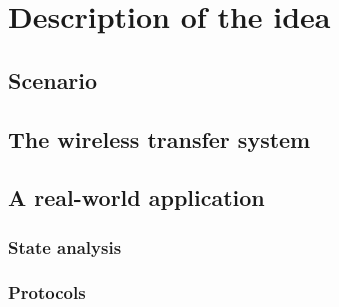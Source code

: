 \documentclass[a4paper, 10pt]{article}
\begin{document}


\section{Description of the idea}
\label{sec:idea}


\subsection{Scenario}
\label{sec:scenario}


\subsection{The wireless transfer system}
\label{sec:realize}


\subsection{A real-world application}


\subsubsection{State analysis}
\label{sec:state}


\subsubsection{Protocols}
\label{sec:proto}

\end{document}
